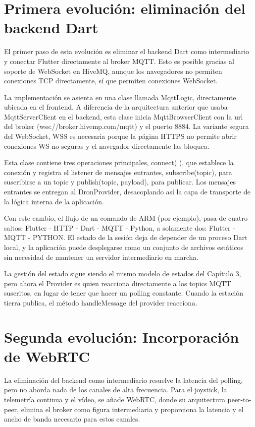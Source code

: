 \section{Primera evolución: eliminación del backend Dart}
El primer paso de esta evolución es eliminar el backend Dart como intermediario y conectar Flutter directamente al broker MQTT. Esto es posible gracias al soporte de WebSocket en HiveMQ, aunque los navegadores no permiten conexiones TCP directamente, sí que permiten conexiones WebSocket.

La implementación se asienta en una clase llamada MqttLogic, directamente ubicada en el frontend. A diferencia de la arquitectura anterior que usaba MqttServerClient en el backend, esta clase inicia MqttBrowserClient con la url del broker (wss://broker.hivemp.com/mqtt) y el puerto 8884. La variante segura del WebSocket, WSS es necesaria porque la página HTTPS no permite abrir conexiones WS no seguras y el navegador directamente las bloquea.

Esta clase contiene tres operaciones principales, connect( ), que establece la conexión y registra el listener de mensajes entrantes, subscribe(topic), para suscribirse a un topic y publish(topic, payload), para publicar. Los mensajes entrantes se entregan al DronProvider, desacoplando así la capa de transporte de la lógica interna de la aplicación.

Con este cambio, el flujo de un comando de ARM (por ejemplo), pasa de cuatro saltos: Flutter - HTTP - Dart - MQTT - Python, a solamente dos: Flutter - MQTT - PYTHON. El estado de la sesión deja de depender de un proceso Dart local, y la aplicación puede desplegarse como un conjunto de archivos estáticos sin necesidad de mantener un servidor intermediario en marcha.

La gestión del estado sigue siendo el mismo modelo de estados del Capítulo 3, pero ahora el Provider es quien reacciona directamente a los topics MQTT suscritos, en lugar de tener que hacer un polling constante. Cuando la estación tierra publica, el método handleMessage del provider reacciona.

\section{Segunda evolución: Incorporación de WebRTC}
La eliminación del backend como intermediario resuelve la latencia del polling, pero no aborda nada de los canales de alta frecuencia. Para el joystick, la telemetría continua y el vídeo, se añade WebRTC, donde su arquitectura peer-to-peer, elimina el broker como figura intermediaria y proporciona la latencia y el ancho de banda necesario para estos canales.

